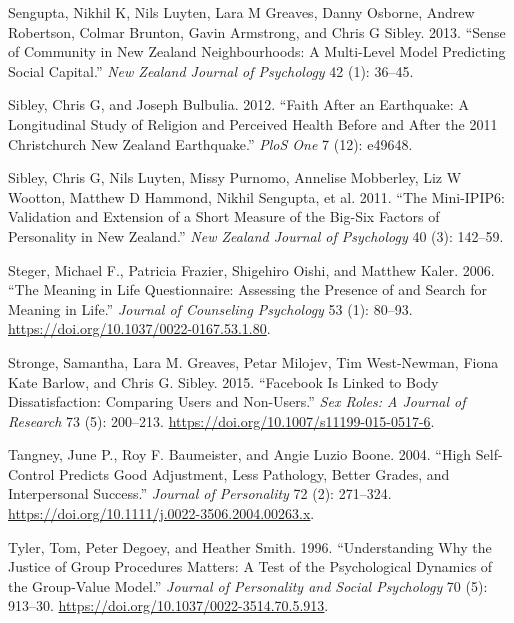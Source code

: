 \documentclass[
  letterpaper,
  DIV=11,
  numbers=noendperiod]{scrartcl}
\newlength{\cslhangindent}
\newlength{\cslentryspacingunit} %
\newenvironment{CSLReferences}[2] %
 {%
  \setlength{\parindent}{0pt}
  \ifodd #1
  \let\oldpar\par
  \def\par{\hangindent=\cslhangindent\oldpar}
  \fi
  \setlength{\parskip}{#2\cslentryspacingunit}
 }%
 {}
\begin{document}
\begin{CSLReferences}{1}{0}
\leavevmode{}%
Sengupta, Nikhil K, Nils Luyten, Lara M Greaves, Danny Osborne, Andrew
Robertson, Colmar Brunton, Gavin Armstrong, and Chris G Sibley. 2013.
{``Sense of Community in New Zealand Neighbourhoods: A Multi-Level Model
Predicting Social Capital.''} \emph{New Zealand Journal of Psychology}
42 (1): 36--45.

\leavevmode{}%
Sibley, Chris G, and Joseph Bulbulia. 2012. {``Faith After an
Earthquake: A Longitudinal Study of Religion and Perceived Health Before
and After the 2011 Christchurch New Zealand Earthquake.''} \emph{PloS
One} 7 (12): e49648.

\leavevmode{}%
Sibley, Chris G, Nils Luyten, Missy Purnomo, Annelise Mobberley, Liz W
Wootton, Matthew D Hammond, Nikhil Sengupta, et al. 2011. {``The
Mini-IPIP6: Validation and Extension of a Short Measure of the Big-Six
Factors of Personality in New Zealand.''} \emph{New Zealand Journal of
Psychology} 40 (3): 142--59.

\leavevmode{}%
Steger, Michael F., Patricia Frazier, Shigehiro Oishi, and Matthew
Kaler. 2006. {``The Meaning in Life Questionnaire: Assessing the
Presence of and Search for Meaning in Life.''} \emph{Journal of
Counseling Psychology} 53 (1): 80--93.
\url{https://doi.org/10.1037/0022-0167.53.1.80}.

\leavevmode{}%
Stronge, Samantha, Lara M. Greaves, Petar Milojev, Tim West-Newman,
Fiona Kate Barlow, and Chris G. Sibley. 2015. {``Facebook Is Linked to
Body Dissatisfaction: Comparing Users and Non-Users.''} \emph{Sex Roles:
A Journal of Research} 73 (5): 200--213.
\url{https://doi.org/10.1007/s11199-015-0517-6}.

\leavevmode{}%
Tangney, June P., Roy F. Baumeister, and Angie Luzio Boone. 2004.
{``High Self-Control Predicts Good Adjustment, Less Pathology, Better
Grades, and Interpersonal Success.''} \emph{Journal of Personality} 72
(2): 271--324. \url{https://doi.org/10.1111/j.0022-3506.2004.00263.x}.

\leavevmode{}%
Tyler, Tom, Peter Degoey, and Heather Smith. 1996. {``Understanding Why
the Justice of Group Procedures Matters: A Test of the Psychological
Dynamics of the Group-Value Model.''} \emph{Journal of Personality and
Social Psychology} 70 (5): 913--30.
\url{https://doi.org/10.1037/0022-3514.70.5.913}.


\end{CSLReferences}
\end{document}
